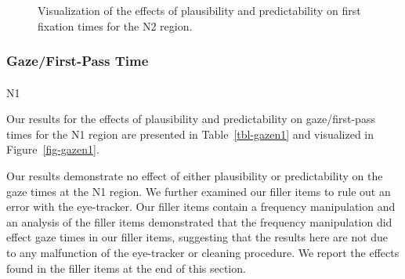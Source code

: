 \documentclass[
  12pt,
  letterpaper,
]{scrreprt}
\makeatletter
\let\oldparagraph\paragraph
\renewcommand{\paragraph}{
    \@ifstar
      \xxxParagraphStar
      \xxxParagraphNoStar
  }
\newcommand{\xxxParagraphStar}[1]{\oldparagraph*{#1}\mbox{}}
\newcommand{\xxxParagraphNoStar}[1]{\oldparagraph{#1}\mbox{}}
\makeatother
\begin{document}
\begin{figure}[htbp]

\caption{\label{fig-firstfixn2}Visualization of the effects of
plausibility and predictability on first fixation times for the N2
region.}


\end{figure}%

\subsubsection{Gaze/First-Pass Time}\label{gazefirst-pass-time-1}

\paragraph{N1}\label{n1-5}

Our results for the effects of plausibility and predictability on
gaze/first-pass times for the N1 region are presented in
Table~\ref{tbl-gazen1} and visualized in Figure~\ref{fig-gazen1}.

Our results demonstrate no effect of either plausibility or
predictability on the gaze times at the N1 region. We further examined
our filler items to rule out an error with the eye-tracker. Our filler
items contain a frequency manipulation and an analysis of the filler
items demonstrated that the frequency manipulation did effect gaze times
in our filler items, suggesting that the results here are not due to any
malfunction of the eye-tracker or cleaning procedure. We report the
effects found in the filler items at the end of this section.
\end{document}
